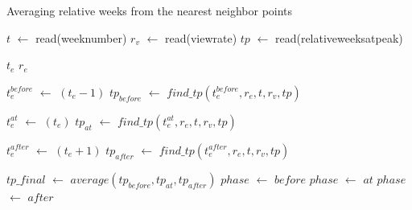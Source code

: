 \documentclass[10pt,final,journal,a4paper]{IEEEtran}
\begin{document}
\begin{algorithm}
\caption{Averaging relative weeks from the nearest neighbor points}
\label{alg2}
\begin{algorithmic}[1]

\STATE $t$ $\leftarrow$ read(weeknumber) 
\STATE $r_v$ $\leftarrow$ read(viewrate) 
\STATE $tp$ $\leftarrow$ read(relativeweeksatpeak) 

\STATE $t_e$ 
\STATE $r_e$ 

\STATE $t_e^{before}$ $\leftarrow$ $(t_e - 1)$ 
\STATE $tp_{before}$ $\leftarrow$ $find\_tp(t_e^{before},r_e,t,r_v,tp)$

\STATE $t_e^{at}$ $\leftarrow$ $(t_e)$ 
\STATE $tp_{at}$ $\leftarrow$ $find\_tp(t_e^{at},r_e,t,r_v,tp)$

\STATE $t_e^{after}$ $\leftarrow$ $(t_e+1)$ 
\STATE $tp_{after}$ $\leftarrow$ $find\_tp(t_e^{after},r_e,t,r_v,tp)$

\STATE $tp\_final$ $\leftarrow$ $average(tp_{before}, tp_{at}, tp_{after})$
\STATE $phase$ $\leftarrow$ $before$
\STATE $phase$ $\leftarrow$ $at$
\ELSE
\STATE $phase$ $\leftarrow$ $after$
\ENDIF
\end{algorithmic}
\end{algorithm}




\end{document}
